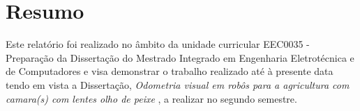 \chapter*{Resumo}

Este relatório foi realizado no âmbito da unidade curricular EEC0035 - Preparação
da Dissertação do Mestrado Integrado em Engenharia Eletrotécnica e de Computadores e visa
demonstrar o trabalho realizado até à presente data tendo em vista a Dissertação, \emph{Odometria visual em robôs para a agricultura com camara(s) com lentes olho de peixe} , a realizar no segundo semestre. 
